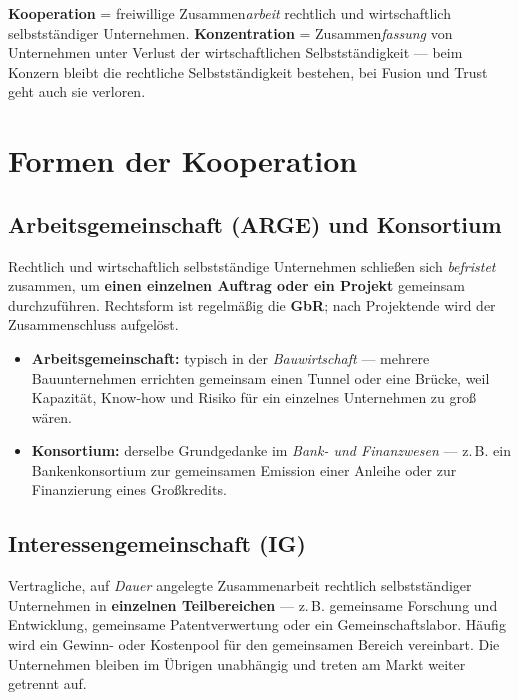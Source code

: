 \documentclass[11pt, a4paper]{article}
\begin{document}
\begin{merksatz}[title={\bfseries Merksatz: Die Kernabgrenzung}]
\textbf{Kooperation} = freiwillige Zusammen\emph{arbeit} rechtlich und wirtschaftlich
selbstständiger Unternehmen. \textbf{Konzentration} = Zusammen\emph{fassung} von
Unternehmen unter Verlust der wirtschaftlichen Selbstständigkeit --- beim Konzern bleibt
die rechtliche Selbstständigkeit bestehen, bei Fusion und Trust geht auch sie verloren.
\end{merksatz}

\section{Formen der Kooperation}

\subsection{Arbeitsgemeinschaft (ARGE) und Konsortium}

Rechtlich und wirtschaftlich selbstständige Unternehmen schließen sich \emph{befristet}
zusammen, um \textbf{einen einzelnen Auftrag oder ein Projekt} gemeinsam durchzuführen.
Rechtsform ist regelmäßig die \textbf{GbR}; nach Projektende wird der Zusammenschluss
aufgelöst.

\begin{itemize}
  \item \textbf{Arbeitsgemeinschaft:} typisch in der \emph{Bauwirtschaft} --- mehrere
    Bauunternehmen errichten gemeinsam einen Tunnel oder eine Brücke, weil Kapazität,
    Know-how und Risiko für ein einzelnes Unternehmen zu groß wären.
  \item \textbf{Konsortium:} derselbe Grundgedanke im \emph{Bank- und Finanzwesen} ---
    z.\,B. ein Bankenkonsortium zur gemeinsamen Emission einer Anleihe oder zur
    Finanzierung eines Großkredits.
\end{itemize}

\subsection{Interessengemeinschaft (IG)}

Vertragliche, auf \emph{Dauer} angelegte Zusammenarbeit rechtlich selbstständiger
Unternehmen in \textbf{einzelnen Teilbereichen} --- z.\,B. gemeinsame Forschung und
Entwicklung, gemeinsame Patentverwertung oder ein Gemeinschaftslabor. Häufig wird ein
Gewinn- oder Kostenpool für den gemeinsamen Bereich vereinbart. Die Unternehmen bleiben
im Übrigen unabhängig und treten am Markt weiter getrennt auf.
\end{document}
